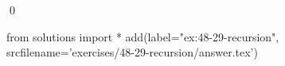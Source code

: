 
\begin{ex}
  \label{ex:48-29-recursion}
  
  \qed
\end{ex}
\begin{python0}
from solutions import *
add(label="ex:48-29-recursion",
    srcfilename='exercises/48-29-recursion/answer.tex')
\end{python0}
